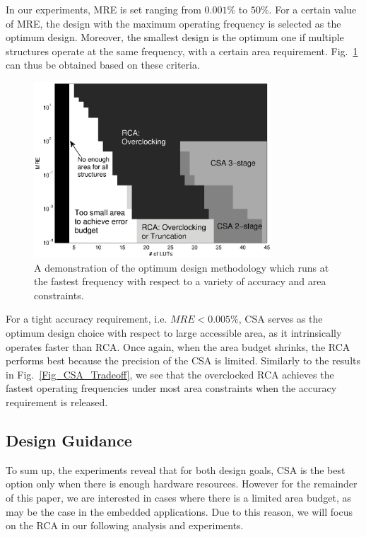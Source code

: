 \documentclass[journal]{IEEEtran}
\begin{document}
In our experiments, MRE is set ranging from $0.001\%$ to $50\%$. For a certain value of MRE, the design with the maximum operating frequency is selected as the optimum design. Moreover, the smallest design is the optimum one if multiple structures operate at the same frequency, with a certain area requirement. Fig.~\ref{Fig_CSA_Tradeoff_Error} can thus be obtained based on these criteria.
\begin{figure}[t]
    \centering
    \includegraphics[width=3.5in]{./Figures/Tradeoff_Error.eps}
    \caption{A demonstration of the optimum design methodology which runs at the fastest frequency with respect to a variety of accuracy and area constraints.}
    \label{Fig_CSA_Tradeoff_Error}
\end{figure}

For a tight accuracy requirement, i.e. $MRE<0.005\%$, CSA serves as the optimum design choice with respect to large accessible area, as it intrinsically operates faster than RCA. Once again, when the area budget shrinks, the RCA performs best because the precision of the CSA is limited. Similarly to the results in Fig.~\ref{Fig_CSA_Tradeoff}, we see that the overclocked RCA achieves the fastest operating frequencies under most area constraints when the accuracy requirement is released.

\subsection{Design Guidance}
To sum up, the experiments reveal that for both design goals, CSA is the best option only when there is enough hardware resources. However for the remainder of this paper, we are interested in cases where there is a limited area budget, as may be the case in the embedded applications. Due to this reason, we will focus on the RCA in our following analysis and experiments.
\end{document}
